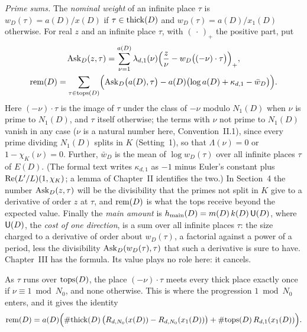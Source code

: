 \emph{Prime sums.} The \emph{nominal weight} of an infinite place $\tau$ is $w_D(\tau)=a(D)/x(D)$ if $\tau\in\mathrm{thick}(D)$ and
$w_D(\tau)=a(D)/x_1(D)$ otherwise. For real $z$ and an infinite place $\tau$, with $(\,\cdot\,)_+$ the positive part, put
\begin{gather*}
\mathrm{Ask}_D(z,\tau)=\sum_{\nu=1}^{a(D)}\lambda_{d,1}(\nu)\Bigl(\frac z\nu-w_D\bigl((-\nu)\cdot\tau\bigr)\Bigr)_{+},\\
\mathrm{rem}(D)=\sum_{\tau\in\mathrm{tops}(D)}\Bigl(\mathrm{Ask}_D\bigl(a(D),\tau\bigr)-a(D)\bigl(\log a(D)+\kappa_{d,1}-\bar w_D\bigr)\Bigr).
\end{gather*}
Here $(-\nu)\cdot\tau$ is the image of $\tau$ under the class of $-\nu$ modulo $N_1(D)$ when $\nu$ is prime to $N_1(D)$, and
$\tau$ itself otherwise; the terms with $\nu$ not prime to $N_1(D)$ vanish in any case ($\nu$ is a natural number here, Convention~II.1), since every prime dividing $N_1(D)$
splits in $K$ (Setting~1), so that $\Lambda(\nu)=0$ or $1-\chi_K(\nu)=0$. Further, $\bar w_D$ is the mean of $\log w_D(\tau)$ over all infinite
places $\tau$ of $E(D)$. (The formal text writes $\kappa_{d,1}$ as $-1$ minus Euler's constant plus
$\operatorname{Re}(L'/L)(1,\chi_K)$; a lemma of Chapter~II identifies the two.) In Section~4 the number $\mathrm{Ask}_D(z,\tau)$ will be
the divisibility that the primes not split in $K$ give to a derivative of order $z$ at $\tau$, and $\mathrm{rem}(D)$ is
what the tops receive beyond the expected value. Finally the \emph{main amount} is
$h_{\mathrm{main}}(D)=m(D)\,k(D)\,\mathsf{U}(D)$, where $\mathsf{U}(D)$, the \emph{cost of one direction}, is a sum over all infinite places
$\tau$: the size charged to a derivative of order about $w_D(\tau)$, a factorial against a power of a period, less the
divisibility $\mathrm{Ask}_D(w_D(\tau),\tau)$ that such a derivative is sure to have. Chapter~III has the formula. Its value
plays no role here: it cancels.

 As $\tau$ runs over $\mathrm{tops}(D)$, the place
$(-\nu)\cdot\tau$ meets every thick place exactly once if $\nu\equiv1\bmod N_0$, and none otherwise. This is where the
progression $1\bmod N_0$ enters, and it gives the identity
\begin{equation}\label{ov:rem}
\mathrm{rem}(D)=a(D)\Bigl(\#\mathrm{thick}(D)\,\bigl(R_{d,N_0}(x(D))-R_{d,N_0}(x_1(D))\bigr)+\#\mathrm{tops}(D)\,R_{d,1}(x_1(D))\Bigr).
\end{equation}


